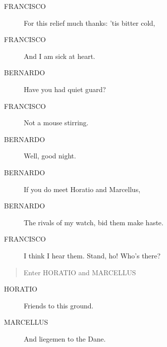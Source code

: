 \documentclass{article}
\begin{document}
\begin{description}
            
\item[FRANCISCO] For this relief much thanks: 'tis bitter cold,
\item[FRANCISCO] And I am sick at heart.
\end{description}
          
\begin{description}
            
\item[BERNARDO] Have you had quiet guard?
\end{description}
          
\begin{description}
            
\item[FRANCISCO] Not a mouse stirring.
\end{description}
          
\begin{description}
            
\item[BERNARDO] Well, good night.
\item[BERNARDO] If you do meet Horatio and Marcellus,
\item[BERNARDO] The rivals of my watch, bid them make haste.
\end{description}
          
\begin{description}
            
\item[FRANCISCO] I think I hear them. Stand, ho! Who's there?
\end{description}
          
\begin{quote}
Enter HORATIO and MARCELLUS
\end{quote}
          
\begin{description}
            
\item[HORATIO] Friends to this ground.
\end{description}
          
\begin{description}
            
\item[MARCELLUS] And liegemen to the Dane.
\end{description}
          
\end{document}
